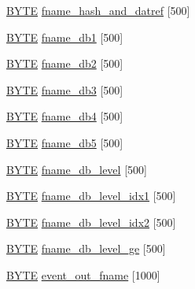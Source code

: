 \begin{DoxyCompactItemize}
\item 
\mbox{\hyperlink{galois_8h_ab6cc7b4aeb6ea31aba2b3fbfc83ff5e6}{B\+Y\+TE}} \mbox{\hyperlink{classisomorph_a98481ece3486a4ce7d4d820fc6e4cc26}{fname\+\_\+hash\+\_\+and\+\_\+datref}} \mbox{[}500\mbox{]}
\item 
\mbox{\hyperlink{galois_8h_ab6cc7b4aeb6ea31aba2b3fbfc83ff5e6}{B\+Y\+TE}} \mbox{\hyperlink{classisomorph_a30945e51b1f08723224a17adf7416fbe}{fname\+\_\+db1}} \mbox{[}500\mbox{]}
\item 
\mbox{\hyperlink{galois_8h_ab6cc7b4aeb6ea31aba2b3fbfc83ff5e6}{B\+Y\+TE}} \mbox{\hyperlink{classisomorph_a1da3e39b94ece245f34d5f8789049dac}{fname\+\_\+db2}} \mbox{[}500\mbox{]}
\item 
\mbox{\hyperlink{galois_8h_ab6cc7b4aeb6ea31aba2b3fbfc83ff5e6}{B\+Y\+TE}} \mbox{\hyperlink{classisomorph_ad993e1897cd311ed5de3953e4e3d1418}{fname\+\_\+db3}} \mbox{[}500\mbox{]}
\item 
\mbox{\hyperlink{galois_8h_ab6cc7b4aeb6ea31aba2b3fbfc83ff5e6}{B\+Y\+TE}} \mbox{\hyperlink{classisomorph_aaa6df8d660ffd4443d55a2228db54b3e}{fname\+\_\+db4}} \mbox{[}500\mbox{]}
\item 
\mbox{\hyperlink{galois_8h_ab6cc7b4aeb6ea31aba2b3fbfc83ff5e6}{B\+Y\+TE}} \mbox{\hyperlink{classisomorph_a3b5fbd68bbb83ca4f0b22f52eed75bb0}{fname\+\_\+db5}} \mbox{[}500\mbox{]}
\item 
\mbox{\hyperlink{galois_8h_ab6cc7b4aeb6ea31aba2b3fbfc83ff5e6}{B\+Y\+TE}} \mbox{\hyperlink{classisomorph_adb03ecd0a0e2cc2a568a20648f60a5d7}{fname\+\_\+db\+\_\+level}} \mbox{[}500\mbox{]}
\item 
\mbox{\hyperlink{galois_8h_ab6cc7b4aeb6ea31aba2b3fbfc83ff5e6}{B\+Y\+TE}} \mbox{\hyperlink{classisomorph_ae292c21db5ef157f332c60e2d072776c}{fname\+\_\+db\+\_\+level\+\_\+idx1}} \mbox{[}500\mbox{]}
\item 
\mbox{\hyperlink{galois_8h_ab6cc7b4aeb6ea31aba2b3fbfc83ff5e6}{B\+Y\+TE}} \mbox{\hyperlink{classisomorph_a5b4cfbf885bf72842bb996f5e38f8e40}{fname\+\_\+db\+\_\+level\+\_\+idx2}} \mbox{[}500\mbox{]}
\item 
\mbox{\hyperlink{galois_8h_ab6cc7b4aeb6ea31aba2b3fbfc83ff5e6}{B\+Y\+TE}} \mbox{\hyperlink{classisomorph_a4e700176be99eaf2064c341799ef3d74}{fname\+\_\+db\+\_\+level\+\_\+ge}} \mbox{[}500\mbox{]}
\item 
\mbox{\hyperlink{galois_8h_ab6cc7b4aeb6ea31aba2b3fbfc83ff5e6}{B\+Y\+TE}} \mbox{\hyperlink{classisomorph_a5b2466ac054fcd655555cc85ea1c026b}{event\+\_\+out\+\_\+fname}} \mbox{[}1000\mbox{]}
\item 

\end{DoxyCompactItemize}
